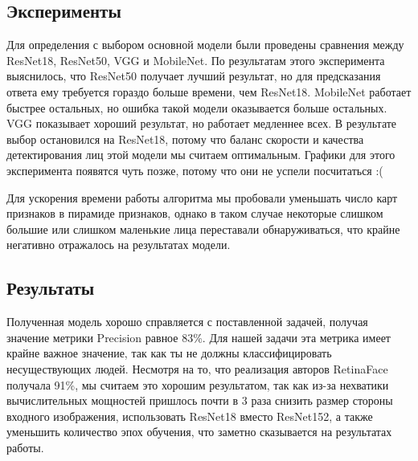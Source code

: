 \subsection{Эксперименты}\label{subsec:эксперименты2}
Для определения с выбором основной модели были проведены сравнения между ResNet18, ResNet50, VGG и MobileNet.
По результатам этого эксперимента выяснилось, что ResNet50 получает лучший результат,
но для предсказания ответа ему требуется гораздо больше времени, чем ResNet18.
MobileNet работает быстрее остальных, но ошибка такой модели оказывается больше остальных.
VGG показывает хороший результат, но работает медленнее всех.
В результате выбор остановился на ResNet18, потому что баланс скорости и качества детектирования лиц этой модели мы считаем оптимальным.
Графики для этого эксперимента появятся чуть позже, потому что они не успели посчитаться :(

Для ускорения времени работы алгоритма мы пробовали уменьшать число карт признаков в пирамиде признаков,
однако в таком случае некоторые слишком большие или слишком маленькие лица переставали обнаруживаться,
что крайне негативно отражалось на результатах модели.

\subsection{Результаты}\label{subsec:результаты2}
Полученная модель хорошо справляется с поставленной задачей, получая значение метрики Precision равное 83\%.
Для нашей задачи эта метрика имеет крайне важное значение, так как ты не должны классифицировать несуществующих людей.
Несмотря на то, что реализация авторов RetinaFace получала 91\%, мы считаем это хорошим результатом,
так как из-за нехватики вычислительных мощностей пришлось почти в 3 раза снизить размер стороны входного изображения,
использовать ResNet18 вместо ResNet152, а также уменьшить количество эпох обучения, что заметно сказывается на результатах работы.

\newpage

